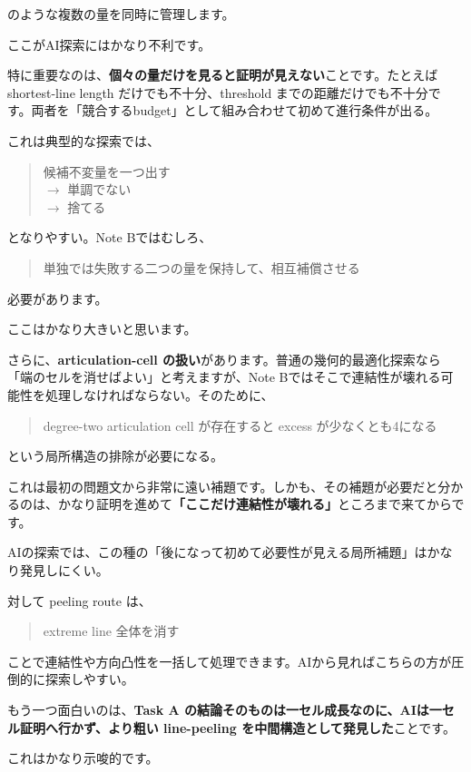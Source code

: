 \documentclass[11pt,a4paper]{article}
\begin{document}
のような複数の量を同時に管理します。

ここがAI探索にはかなり不利です。

特に重要なのは、\textbf{個々の量だけを見ると証明が見えない}ことです。たとえば shortest-line length だけでも不十分、threshold までの距離だけでも不十分です。両者を「競合するbudget」として組み合わせて初めて進行条件が出る。

これは典型的な探索では、

\begin{quote}
候補不変量を一つ出す\\
$\to$ 単調でない\\
$\to$ 捨てる
\end{quote}

となりやすい。Note Bではむしろ、

\begin{quote}
単独では失敗する二つの量を保持して、相互補償させる
\end{quote}

必要があります。

ここはかなり大きいと思います。

さらに、\textbf{articulation-cell の扱い}があります。普通の幾何的最適化探索なら「端のセルを消せばよい」と考えますが、Note Bではそこで連結性が壊れる可能性を処理しなければならない。そのために、

\begin{quote}
degree-two articulation cell が存在すると excess が少なくとも4になる
\end{quote}

という局所構造の排除が必要になる。

これは最初の問題文から非常に遠い補題です。しかも、その補題が必要だと分かるのは、かなり証明を進めて\textbf{「ここだけ連結性が壊れる」}ところまで来てからです。

AIの探索では、この種の「後になって初めて必要性が見える局所補題」はかなり発見しにくい。

対して peeling route は、

\begin{quote}
extreme line 全体を消す
\end{quote}

ことで連結性や方向凸性を一括して処理できます。AIから見ればこちらの方が圧倒的に探索しやすい。

もう一つ面白いのは、\textbf{Task A の結論そのものは一セル成長なのに、AIは一セル証明へ行かず、より粗い line-peeling を中間構造として発見した}ことです。

これはかなり示唆的です。
\end{document}
